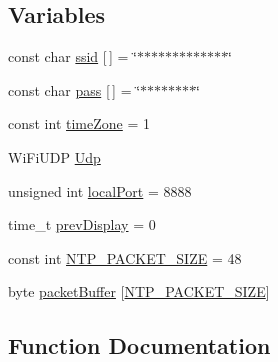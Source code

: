 \subsection*{Variables}
\begin{DoxyCompactItemize}
\item 
const char \hyperlink{_time_n_t_p___e_s_p8266_wi_fi_8ino_a2961a3ee6daab3612c6258629032802d}{ssid} \mbox{[}$\,$\mbox{]} = \char`\"{}$\ast$$\ast$$\ast$$\ast$$\ast$$\ast$$\ast$$\ast$$\ast$$\ast$$\ast$$\ast$$\ast$\char`\"{}
\item 
const char \hyperlink{_time_n_t_p___e_s_p8266_wi_fi_8ino_a5a1325b7c2160dc5aebb1259a2fd1094}{pass} \mbox{[}$\,$\mbox{]} = \char`\"{}$\ast$$\ast$$\ast$$\ast$$\ast$$\ast$$\ast$$\ast$\char`\"{}
\item 
const int \hyperlink{_time_n_t_p___e_s_p8266_wi_fi_8ino_a14e0b2c2e0a918b5dd0706f6cad48191}{time\+Zone} = 1
\item 
Wi\+Fi\+U\+DP \hyperlink{_time_n_t_p___e_s_p8266_wi_fi_8ino_ae2719168871b1327c58259f1d4c68577}{Udp}
\item 
unsigned int \hyperlink{_time_n_t_p___e_s_p8266_wi_fi_8ino_ac240824c9b35035b41bc24ee200565a2}{local\+Port} = 8888
\item 
time\+\_\+t \hyperlink{_time_n_t_p___e_s_p8266_wi_fi_8ino_a32a8e1cc3c668b1328fd21df4649182f}{prev\+Display} = 0
\item 
const int \hyperlink{_time_n_t_p___e_s_p8266_wi_fi_8ino_ae2843b6487d71a38433763495c106346}{N\+T\+P\+\_\+\+P\+A\+C\+K\+E\+T\+\_\+\+S\+I\+ZE} = 48
\item 
byte \hyperlink{_time_n_t_p___e_s_p8266_wi_fi_8ino_a64bc3d70081888ef346f466f8cffcaa9}{packet\+Buffer} \mbox{[}\hyperlink{_time_n_t_p___e_s_p8266_wi_fi_8ino_ae2843b6487d71a38433763495c106346}{N\+T\+P\+\_\+\+P\+A\+C\+K\+E\+T\+\_\+\+S\+I\+ZE}\mbox{]}
\end{DoxyCompactItemize}


\subsection{Function Documentation}
\mbox{\label{_time_n_t_p___e_s_p8266_wi_fi_8ino_a01f3a72442d58926459c48afce4746e7}} 
